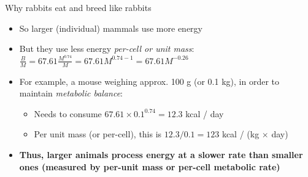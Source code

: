   \begin{frame}{Why rabbits eat and breed like rabbits}

  \begin{itemize}[<+->]\setlength{\itemindent}{-1em} \itemsep6pt 

    \item So larger (individual) mammals use more energy 
    
    \item {} But they use less energy {\it per-cell or unit mass\footnotemark}: $\frac{B}{M} = 67.61 \frac{M^{0.74}}{M} = 67.61 M^{0.74-1} = 67.61 M^{-0.26}$
              
    \item For example, a mouse weighing approx. 100 g (or 0.1 kg), in order to maintain {\it metabolic balance}:
      \begin{itemize}
        \item Needs to consume $67.61 \times 0.1^{0.74} = 12.3$ kcal / day
        \item Per unit mass (or per-cell), this is $12.3/0.1 = 123$ kcal / (kg $\times$ day)
      \end{itemize}
    
     \item  {\bf Thus, larger animals process energy at a slower rate than smaller ones (measured by per-unit mass or per-cell metabolic rate)}


    \end{itemize}
  
  
  \end{frame}

